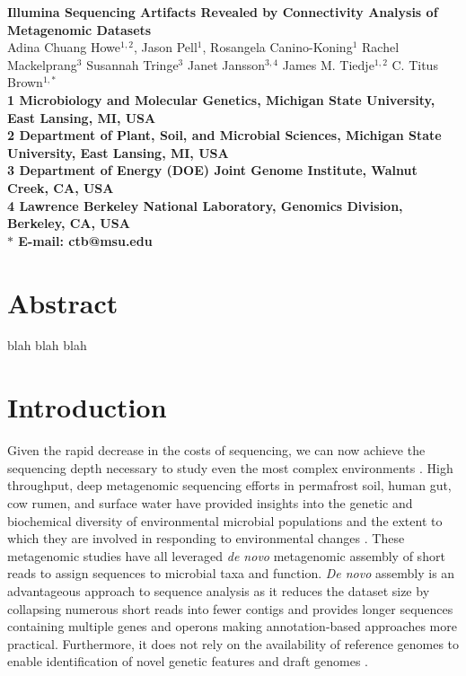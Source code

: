 \documentclass[10pt]{article}
\date{}
\begin{document}
\begin{flushleft}
{\Large
\textbf{Illumina Sequencing Artifacts Revealed by Connectivity Analysis of Metagenomic Datasets}
}
\\
Adina Chuang Howe$^{1,2}$, 
Jason Pell$^{1}$,
Rosangela Canino-Koning$^{1}$
Rachel Mackelprang$^{3}$
Susannah Tringe$^{3}$
Janet Jansson$^{3,4}$ 
James M. Tiedje$^{1,2}$
C. Titus Brown$^{1,\ast}$
\\
\bf{1} Microbiology and Molecular Genetics, Michigan State University, East Lansing, MI, USA
\\
\bf{2} Department of Plant, Soil, and Microbial Sciences, Michigan State University, East Lansing, MI, USA
\\
\bf{3} Department of Energy (DOE) Joint Genome Institute, Walnut Creek, CA, USA
\\
\bf{4} Lawrence Berkeley National Laboratory, Genomics Division, Berkeley, CA, USA
\\
$\ast$ E-mail: ctb@msu.edu
\end{flushleft}

\section*{Abstract}
blah blah blah

\section*{Introduction}
Given the rapid decrease in the costs of sequencing, we can now achieve the sequencing depth necessary to study even the most complex environments \cite{Hess:2011p686,Qin:2010p189}.  High throughput, deep metagenomic sequencing efforts in permafrost soil, human gut, cow rumen, and surface water have provided insights into the genetic and biochemical diversity of environmental microbial populations \cite{Hess:2011p686,Iverson:2012p1281,Qin:2010p189} and the extent to which they are involved in responding to environmental changes \cite{Mackelprang:2011p1087}. These metagenomic studies have all leveraged \emph{de novo} metagenomic assembly of short reads to assign sequences to microbial taxa and function.  \emph{De novo} assembly is an advantageous approach to sequence analysis as it reduces the dataset size by collapsing numerous short reads into fewer contigs and provides longer sequences containing multiple genes and operons \cite{Miller:2010p226,Pop:2009p798} making annotation-based approaches more practical.  Furthermore, it does not rely on the availability of reference genomes to enable identification of novel genetic features and draft genomes \cite{Hess:2011p686,Iverson:2012p1281}.
\end{document}
